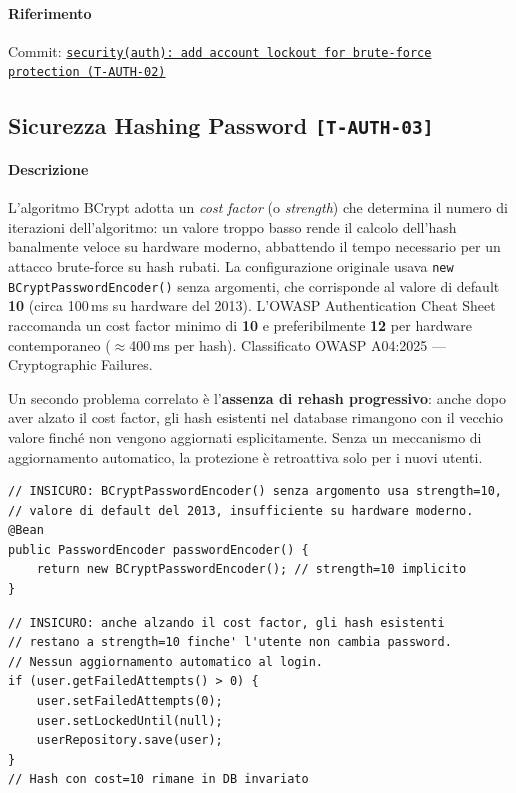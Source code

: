 ﻿\documentclass[a4paper,12pt]{report}
\newcommand{\commitref}[2]{\texttt{\small \href{https://github.com/diegoandruccioli/hotel-pms/commit/#1}{#2}}}
\newcommand{\threat}[1]{\texttt{\small\textcolor{vulnred}{[#1]}}}
\begin{document}
\paragraph{Riferimento} Commit: \commitref{a90e462}{security(auth): add account lockout for brute-force \\ protection (T-AUTH-02)}

\subsection{Sicurezza Hashing Password \threat{T-AUTH-03}}

\paragraph{Descrizione}
L'algoritmo BCrypt adotta un \textit{cost factor} (o \textit{strength}) che determina il numero
di iterazioni dell'algoritmo: un valore troppo basso rende il calcolo dell'hash banalmente veloce
su hardware moderno, abbattendo il tempo necessario per un attacco brute-force su hash rubati.
La configurazione originale usava \texttt{new BCryptPasswordEncoder()} senza argomenti,
che corrisponde al valore di default \textbf{10} (circa 100\,ms su hardware del 2013).
L'OWASP Authentication Cheat Sheet raccomanda un cost factor minimo di \textbf{10} e
preferibilmente \textbf{12} per hardware contemporaneo (\(\approx\)400\,ms per hash).
Classificato OWASP A04:2025 --- Cryptographic Failures.

Un secondo problema correlato è l'\textbf{assenza di rehash progressivo}: anche dopo
aver alzato il cost factor, gli hash esistenti nel database rimangono con il vecchio valore
finché non vengono aggiornati esplicitamente. Senza un meccanismo di aggiornamento automatico,
la protezione è retroattiva solo per i nuovi utenti.

\begin{insecurebox}[title={Codice Vulnerabile --- SecurityConfig.java (cost factor 10 implicito)}]
\begin{lstlisting}[style=java]
// INSICURO: BCryptPasswordEncoder() senza argomento usa strength=10,
// valore di default del 2013, insufficiente su hardware moderno.
@Bean
public PasswordEncoder passwordEncoder() {
    return new BCryptPasswordEncoder(); // strength=10 implicito
}
\end{lstlisting}
\end{insecurebox}

\begin{insecurebox}[title={Codice Vulnerabile --- AuthServiceImpl.java (nessun rehash progressivo)}]
\begin{lstlisting}[style=java]
// INSICURO: anche alzando il cost factor, gli hash esistenti
// restano a strength=10 finche' l'utente non cambia password.
// Nessun aggiornamento automatico al login.
if (user.getFailedAttempts() > 0) {
    user.setFailedAttempts(0);
    user.setLockedUntil(null);
    userRepository.save(user);
}
// Hash con cost=10 rimane in DB invariato
\end{lstlisting}
\end{insecurebox}
\end{document}
